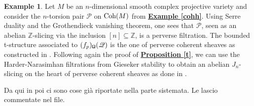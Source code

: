 \documentclass{article}
\theoremstyle{definition}
\newtheorem{exmp}[thm]{Example}
\begin{document}
\begin{exmp}
Let $M$ be an $n$-dimensional smooth complex projective variety and consider the $n$-torsion pair $\mathscr{P}$ on $\textnormal{Coh}(M)$ from \hyperref[cohh]{\textbf{Example \ref*{cohh}}}. Using Serre duality and the Grothendieck vanishing theorem, one sees that $\mathscr{P}$, seen as an abelian $\mathbb{Z}$-slicing via the inclusion $[n] \subseteq \mathbb{Z}$, is a perverse filtration. The bounded t-structure associated to $(f_p)_{\textnormal{\Libra}}(\mathscr{Q})$ is the one of perverse coherent sheaves as constructed in \cite{bez}. Following again the proof of \hyperref[t]{\textbf{Proposition \ref*{t}}}, we can use the Harder-Narasimhan filtrations from Gieseker stability to obtain an abelian $J_n$-slicing on the heart of perverse coherent sheaves as done in \cite{perpol}. 
\end{exmp}


{\Huge Da qui in poi ci sono cose gi\`a riportate nella parte sistemata. Le lascio commentate nel file.} 
\end{document}
